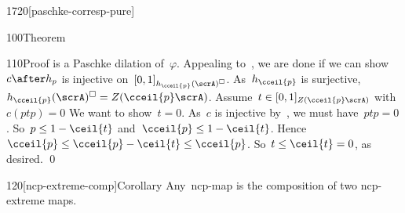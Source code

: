 \begin{parsec}{1720}[paschke-corresp-pure]
\begin{point}{100}{Theorem}
\begin{point}{110}{Proof}
    is a Paschke dilation of~$\varphi$.
Appealing to~,
    we are done if we can show~$c \after h_p$
    is injective on~$[0,1]_{h_{\cceil{p}}(\scrA)^\square}$.
As~$h_{\cceil{p}}$ is surjective,
    $h_{\cceil{p}}(\scrA)^\square = Z(\cceil{p} \scrA)$.
    Assume~$t \in [0,1]_{Z(\cceil{p} \scrA)}$ with~$c(ptp)=0$
We want to show~$t = 0$.
As~$c$ is injective by~,
        we must have~$ptp = 0$.
So~$p \leq 1- \ceil{t}$
and~$\cceil{p} \leq 1- \ceil{t}$.
Hence~$\cceil{p} \leq \cceil{p} - \ceil{t} \leq \cceil{p}$.
So~$t \leq \ceil{t }=0$, as desired. \qed
\end{point}
\end{point}
\begin{point}{120}[ncp-extreme-comp]{Corollary}%
    Any~ncp-map is the composition of two ncp-extreme maps.
\end{point}
\end{parsec}


